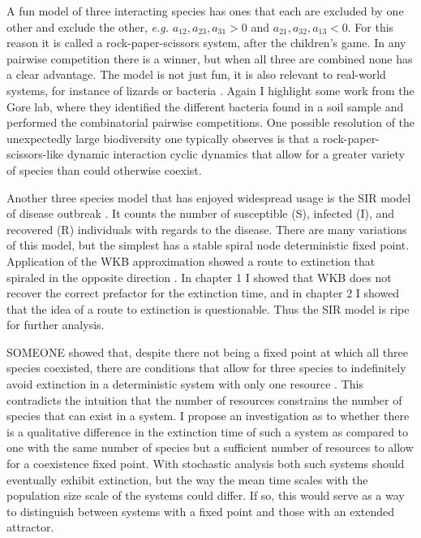 A fun model of three interacting species has ones that each are excluded by one other and exclude the other, \emph{e.g.} $a_{12},a_{23},a_{31}>0$ and $a_{21},a_{32},a_{13}<0$.  
For this reason it is called a rock-paper-scissors system, after the children's game. 
In any pairwise competition there is a winner, but when all three are combined none has a clear advantage. 
The model is not just fun, it is also relevant to real-world systems, for instance of lizards \cite{???} or bacteria \cite{???}. 
Again I highlight some work from the Gore lab, where they identified the different bacteria found in a soil sample and performed the combinatorial pairwise competitions. 
One possible resolution of the unexpectedly large biodiversity one typically observes is that a rock-paper-scissors-like dynamic interaction cyclic dynamics that allow for a greater variety of species than could otherwise coexist. 

Another three species model that has enjoyed widespread usage is the SIR model of disease outbreak \cite{???}. 
It counts the number of susceptible (S), infected (I), and recovered (R) individuals with regards to the disease. 
There are many variations of this model, but the simplest has a stable spiral node deterministic fixed point. 
Application of the WKB approximation showed a route to extinction that spiraled in the opposite direction \cite{???}. 
In chapter 1 I showed that WKB does not recover the correct prefactor for the extinction time, and in chapter 2 I showed that the idea of a route to extinction is questionable. 
Thus the SIR model is ripe for further analysis. 

SOMEONE showed that, despite there not being a fixed point at which all three species coexisted, there are conditions that allow for three species to indefinitely avoid extinction in a deterministic system with only one resource \cite{??Smale??}. 
This contradicts the intuition that the number of resources constrains the number of species that can exist in a system. 
I propose an investigation as to whether there is a qualitative difference in the extinction time of such a system as compared to one with the same number of species but a sufficient number of resources to allow for a coexistence fixed point. 
With stochastic analysis both such systems should eventually exhibit extinction, but the way the mean time scales with the population size scale of the systems could differ. 
If so, this would serve as a way to distinguish between systems with a fixed point and those with an extended attractor. 

